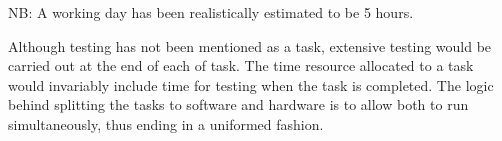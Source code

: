 \documentclass{article}
\begin{document}
NB: A working day has been realistically estimated to be 5 hours.

Although testing has not been mentioned as a task, extensive testing would be carried out at the end of each of task. The time resource allocated to a task would invariably include time for testing when the task is completed. The logic behind splitting the tasks to software and hardware is to allow both to run simultaneously, thus ending in a uniformed fashion.
\end{document}
